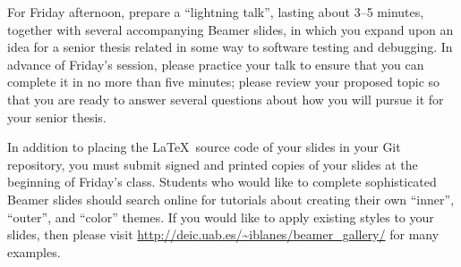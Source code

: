 For Friday afternoon, prepare a ``lightning talk'', lasting about 3--5 minutes, together with several accompanying
Beamer slides, in which you expand upon an idea for a senior thesis related in some way to software testing and
debugging. In advance of Friday's session, please practice your talk to ensure that you can complete it in no more than
five minutes; please review your proposed topic so that you are ready to answer several questions about how you will
pursue it for your senior thesis.

In addition to placing the \LaTeX\ source code of your slides in your Git repository, you must submit signed and printed
copies of your slides at the beginning of Friday's class. Students who would like to complete sophisticated Beamer
slides should search online for tutorials about creating their own ``inner'', ``outer'', and ``color'' themes. If you
would like to apply existing styles to your slides, then please visit \url{http://deic.uab.es/~iblanes/beamer_gallery/}
for many examples.


